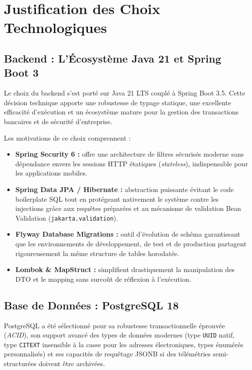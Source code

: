 \documentclass[12pt,a4paper,twoside,openright]{report}
\newcommand{\itembullet}{\textcolor{secondaryBlue}{$\blacktriangleright$}}
\begin{document}
  \section{Justification des Choix Technologiques}

  \subsection{Backend : L'\'Ecosyst\`eme Java 21 et Spring Boot 3}
  \begin{techDecision}
  Le choix du backend s'est port\'e sur Java 21 LTS coupl\'e \`a Spring Boot 3.5. Cette d\'ecision technique apporte une robustesse de typage statique, une excellente efficacit\'e d'ex\'ecution et un \'ecosyst\`eme mature pour la gestion des transactions bancaires et de s\'ecurit\'e d'entreprise.
  \end{techDecision}

  Les motivations de ce choix comprennent :
  \begin{itemize}[label=\itembullet]
    \item \textbf{Spring Security 6 :} offre une architecture de filtres s\'ecuris\'es moderne sans d\'ependance envers les sessions HTTP \'etatiques (\textit{stateless}), indispensable pour les applications mobiles.
    \item \textbf{Spring Data JPA / Hibernate :} abstraction puissante \'evitant le code boilerplate SQL tout en prot\'egeant nativement le syst\`eme contre les injections gr\^ace aux requ\^etes pr\'epar\'ees et au m\'ecanisme de validation Bean Validation (\texttt{jakarta.validation}).
    \item \textbf{Flyway Database Migrations :} outil d'\'evolution de sch\'ema garantissant que les environnements de d\'eveloppement, de test et de production partagent rigoureusement la m\^eme structure de tables horodat\'ee.
    \item \textbf{Lombok \& MapStruct :} simplifient drastiquement la manipulation des DTO et le mapping sans surco\^ut de r\'eflexion \`a l'ex\'ecution.
  \end{itemize}

  \subsection{Base de Donn\'ees : PostgreSQL 18}
  PostgreSQL a \'et\'e s\'electionn\'e pour sa robustesse transactionnelle \'eprouv\'ee (\textit{ACID}), son support avanc\'e des types de donn\'ees modernes (type \texttt{UUID} natif, type \texttt{CITEXT} insensible \`a la casse pour les adresses \'electroniques, types \'enum\'er\'es personnalis\'es) et ses capacit\'es de requ\^etage JSONB si des t\'el\'em\'etries semi-structur\'ees doivent \^etre archiv\'ees.
\end{document}
